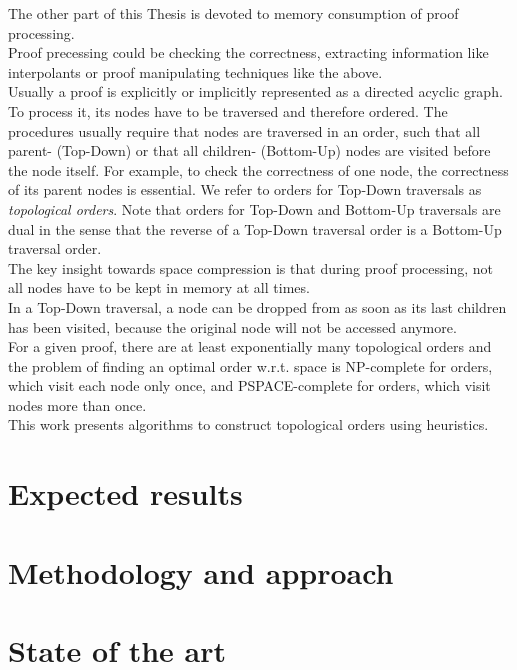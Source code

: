The other part of this Thesis is devoted to memory consumption of proof processing.\\
Proof precessing could be checking the correctness, extracting information like interpolants or proof manipulating techniques like the above.\\
Usually a proof is explicitly or implicitly represented as a directed acyclic graph.
To process it, its nodes have to be traversed and therefore ordered.
The procedures usually require that nodes are traversed in an order, such that all parent- (Top-Down) or that all children- (Bottom-Up) nodes are visited before the node itself.
For example, to check the correctness of one node, the correctness of its parent nodes is essential. 
We refer to orders for Top-Down traversals as \emph{topological orders}. Note that orders for Top-Down and Bottom-Up traversals are dual in the sense that the reverse of a Top-Down traversal order is a Bottom-Up traversal order.\\
The key insight towards space compression is that during proof processing, not all nodes have to be kept in memory at all times.\\
In a Top-Down traversal, a node can be dropped from as soon as its last children has been visited, because the original node will not be accessed anymore.\\
For a given proof, there are at least exponentially many topological orders and the problem of finding an optimal order w.r.t. space is NP-complete \cite{TODO} for orders, which visit each node only once, and PSPACE-complete \cite{TODO} for orders, which visit nodes more than once.\\
This work presents algorithms to construct topological orders using heuristics.


\section{Expected results}

\section{Methodology and approach}

\section{State of the art}
